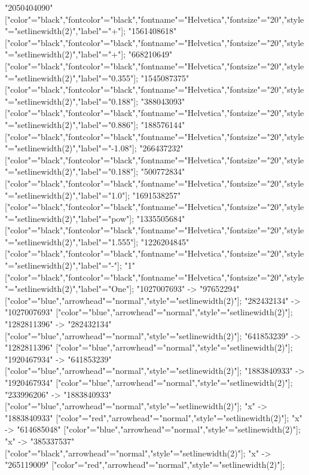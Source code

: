 {    "2050404090" ["color"="black","fontcolor"="black","fontname"="Helvetica","fontsize"="20","style"="setlinewidth(2)","label"="+"];
    "1561408618" ["color"="black","fontcolor"="black","fontname"="Helvetica","fontsize"="20","style"="setlinewidth(2)","label"="+"];
    "668210649" ["color"="black","fontcolor"="black","fontname"="Helvetica","fontsize"="20","style"="setlinewidth(2)","label"="0.355"];
    "1545087375" ["color"="black","fontcolor"="black","fontname"="Helvetica","fontsize"="20","style"="setlinewidth(2)","label"="0.188"];
    "388043093" ["color"="black","fontcolor"="black","fontname"="Helvetica","fontsize"="20","style"="setlinewidth(2)","label"="0.886"];
    "188576144" ["color"="black","fontcolor"="black","fontname"="Helvetica","fontsize"="20","style"="setlinewidth(2)","label"="-1.08"];
    "266437232" ["color"="black","fontcolor"="black","fontname"="Helvetica","fontsize"="20","style"="setlinewidth(2)","label"="0.188"];
    "500772834" ["color"="black","fontcolor"="black","fontname"="Helvetica","fontsize"="20","style"="setlinewidth(2)","label"="1.0"];
    "1691538257" ["color"="black","fontcolor"="black","fontname"="Helvetica","fontsize"="20","style"="setlinewidth(2)","label"="pow"];
    "1335505684" ["color"="black","fontcolor"="black","fontname"="Helvetica","fontsize"="20","style"="setlinewidth(2)","label"="1.555"];
    "1226204845" ["color"="black","fontcolor"="black","fontname"="Helvetica","fontsize"="20","style"="setlinewidth(2)","label"="-"];
    "1" ["color"="black","fontcolor"="black","fontname"="Helvetica","fontsize"="20","style"="setlinewidth(2)","label"="One"];
    "1027007693" -> "97652294" ["color"="blue","arrowhead"="normal","style"="setlinewidth(2)"];
    "282432134" -> "1027007693" ["color"="blue","arrowhead"="normal","style"="setlinewidth(2)"];
    "1282811396" -> "282432134" ["color"="blue","arrowhead"="normal","style"="setlinewidth(2)"];
    "641853239" -> "1282811396" ["color"="blue","arrowhead"="normal","style"="setlinewidth(2)"];
    "1920467934" -> "641853239" ["color"="blue","arrowhead"="normal","style"="setlinewidth(2)"];
    "1883840933" -> "1920467934" ["color"="blue","arrowhead"="normal","style"="setlinewidth(2)"];
    "233996206" -> "1883840933" ["color"="blue","arrowhead"="normal","style"="setlinewidth(2)"];
    "x" -> "1883840933" ["color"="red","arrowhead"="normal","style"="setlinewidth(2)"];
    "x" -> "614685048" ["color"="blue","arrowhead"="normal","style"="setlinewidth(2)"];
    "x" -> "385337537" ["color"="black","arrowhead"="normal","style"="setlinewidth(2)"];
    "x" -> "265119009" ["color"="red","arrowhead"="normal","style"="setlinewidth(2)"];
}
